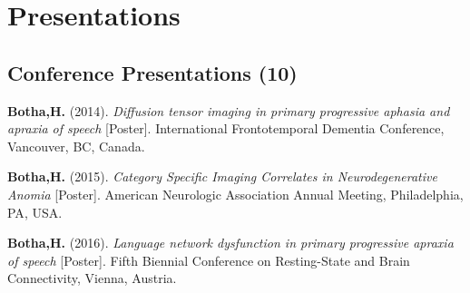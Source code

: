 \documentclass[11pt, a4paper]{awesome-cv}
\begin{document}
\begin{cventries}
    \vspace{-4.0mm}
    \vspace{-4.0mm}
    \vspace{-4.0mm}
    \vspace{-4.0mm}
\end{cventries}

\hypertarget{presentations}{%
\section{Presentations}\label{presentations}}

\hypertarget{conference-presentations-10}{%
\subsection{Conference Presentations
(10)}\label{conference-presentations-10}}

\begingroup
\footnotesize
\setlength{\leftskip}{0.1in}
\setlength{\parindent}{-0.1in}

\hypertarget{refs_selected}{}
\leavevmode\hypertarget{ref-Botha_FTD_2014}{}%
\textbf{Botha,H.} (2014). \emph{{Diffusion tensor imaging in primary
progressive aphasia and apraxia of speech}} {[}Poster{]}. {International
Frontotemporal Dementia Conference}, Vancouver, {BC}, {Canada}.

\leavevmode\hypertarget{ref-Botha_ANA_2015}{}%
\textbf{Botha,H.} (2015). \emph{{Category Specific Imaging Correlates in
Neurodegenerative Anomia}} {[}Poster{]}. {American Neurologic
Association Annual Meeting}, Philadelphia, {PA}, {USA}.

\leavevmode\hypertarget{ref-Botha_REST_2016}{}%
\textbf{Botha,H.} (2016). \emph{{Language network dysfunction in primary
progressive apraxia of speech}} {[}Poster{]}. {Fifth Biennial Conference
on Resting-State and Brain Connectivity}, Vienna, {Austria}.
\end{document}
